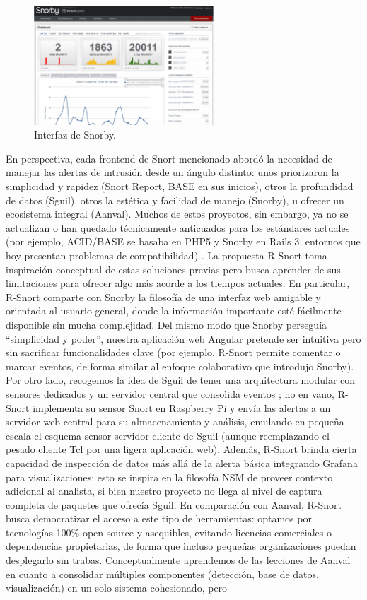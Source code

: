 \documentclass[11pt,a4paper,twoside]{report}
\begin{document}
\begin{figure}[H]
	\centering
	\includegraphics[width=0.6\textwidth]{documento/22.png}
	\caption{Interfaz de Snorby.}
	\label{fig:snorby}
\end{figure}

En perspectiva, cada frontend de Snort mencionado abordó la necesidad de manejar las alertas de intrusión desde un ángulo distinto: unos priorizaron la simplicidad y rapidez (Snort Report, BASE en sus inicios), otros la profundidad de datos (Sguil), otros la estética y facilidad de manejo (Snorby), u ofrecer un ecosistema integral (Aanval). Muchos de estos proyectos, sin embargo, ya no se actualizan o han quedado técnicamente anticuados para los estándares actuales (por ejemplo, ACID/BASE se basaba en PHP5 y Snorby en Rails 3, entornos que hoy presentan problemas de compatibilidad) \cite{StackExchange2011}. La propuesta R-Snort toma inspiración conceptual de estas soluciones previas pero busca aprender de sus limitaciones para ofrecer algo más acorde a los tiempos actuales. En particular, R-Snort comparte con Snorby la filosofía de una interfaz web amigable y orientada al usuario general, donde la información importante esté fácilmente disponible sin mucha complejidad. Del mismo modo que Snorby perseguía “simplicidad y poder”, nuestra aplicación web Angular pretende ser intuitiva pero sin sacrificar funcionalidades clave (por ejemplo, R-Snort permite comentar o marcar eventos, de forma similar al enfoque colaborativo que introdujo Snorby). Por otro lado, recogemos la idea de Sguil de tener una arquitectura modular con sensores dedicados y un servidor central que consolida eventos \cite{sectoolsSguil}; no en vano, R-Snort implementa su sensor Snort en Raspberry Pi y envía las alertas a un servidor web central para su almacenamiento y análisis, emulando en pequeña escala el esquema sensor-servidor-cliente de Sguil (aunque reemplazando el pesado cliente Tcl por una ligera aplicación web). Además, R-Snort brinda cierta capacidad de inspección de datos más allá de la alerta básica integrando Grafana para visualizaciones; esto se inspira en la filosofía NSM de proveer contexto adicional al analista, si bien nuestro proyecto no llega al nivel de captura completa de paquetes que ofrecía Sguil. En comparación con Aanval, R-Snort busca democratizar el acceso a este tipo de herramientas: optamos por tecnologías 100\% open source y asequibles, evitando licencias comerciales o dependencias propietarias, de forma que incluso pequeñas organizaciones puedan desplegarlo sin trabas. Conceptualmente aprendemos de las lecciones de Aanval en cuanto a consolidar múltiples componentes (detección, base de datos, visualización) en un solo sistema cohesionado, pero 
\end{document}
